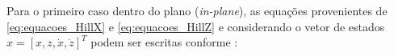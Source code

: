 Para o primeiro caso dentro do plano (\textit{in-plane}), as equações provenientes de \eqref{eq:equacoes_HillX} e \eqref{eq:equacoes_HillZ} e considerando o vetor de estados $x = [x,z, \dot{x}, \dot{z}]^T$ podem ser escritas conforme \cite{fehse2003}:


